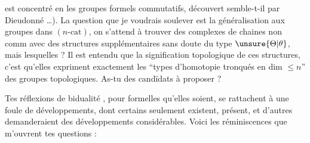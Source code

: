   est concentré en les groupes formels commutatifs, découvert semble-t-il par Dieudonné \dots). La question que je voudrais soulever est la généralisation aux groupes dans $(n\text{-cat})$, on s'attend à trouver des complexes de chaines non comm
avec des structures supplémentaires sans doute du type $\unsure{\Theta|\theta}$, mais lesquelles ? Il est entendu que la signification topologique de ces structures, c'est qu'elles expriment exactement les ``types d'homotopie tronqués en dim $\leq n$'' des groupes topologiques. 
As-tu des candïdats à proposer ?


 Tes réflexions de bidualité , pour formelles qu'elles soient, se rattachent à une foule de développements, dont certains seulement existent,   présent, et d'autres demanderaient des développements considérables. Voici les réminiscences que m'ouvrent tes  questions :

